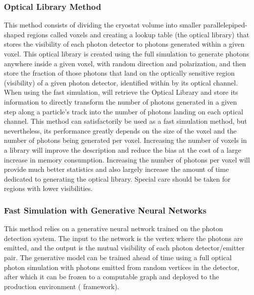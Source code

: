 \documentclass[../main-v1.tex]{subfiles}
\begin{document}
\subsubsection{Optical Library Method}

This method consists of dividing the cryostat volume into smaller parallelepiped-shaped regions called voxels and creating a lookup table %
(the optical library) %
that  stores the visibility of each photon detector to photons  generated within a given voxel.
This optical library is created using the full  simulation to generate photons anywhere inside a given voxel, with random direction and polarization, and then store the fraction of those photons that land on the optically sensitive region (visibility) of a given photon detector, identified within   by its optical channel. When using the fast simulation,   will retrieve the Optical Library and store its information to directly transform the number %
of photons generated in a given step along a particle's track into the number of photons landing on each optical channel.
This method can satisfactorily %
be used as a fast simulation method, but nevertheless, %
its performance greatly depends on the size of the voxel and the number of photons being generated per voxel. Increasing the number of voxels in a library will improve the description and reduce the bias at the cost of a large increase in memory consumption. Increasing the number of photons per voxel will provide much better statistics and also largely increase the amount of time dedicated to generating the optical library. Special care should be taken for regions with %
lower visibilities.

\subsubsection{Fast Simulation with Generative Neural Networks}

This method relies on a generative neural network  trained on the photon detection system. 
The input to the network is the vertex where the photons are emitted, and the output is the mutual visibility of each photon detector/emitter pair. %
The generative model can be trained ahead of time using a full   optical photon simulation with photons emitted from random vertices in the detector, after which it can be frozen to a computable graph and deployed to the production environment (  framework).
\end{document}
